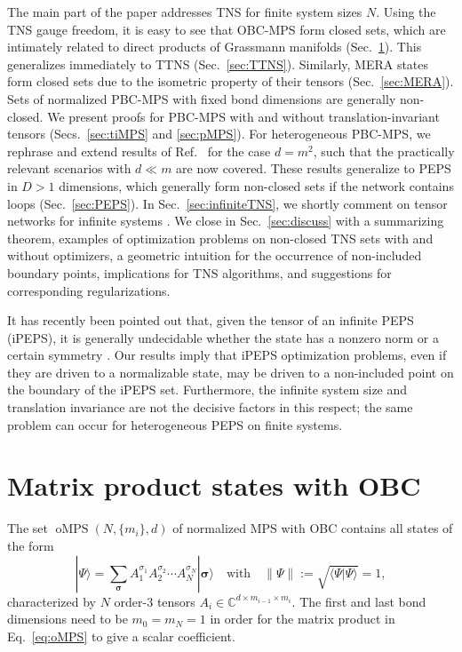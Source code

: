 \documentclass[english,11pt,aps,pra,onecolumn,tightenlines,groupedaddress,superscriptaddress,notitlepage,floatfix,fleqn]{revtex4-1}
\newcommand{\bra}{\langle}
\newcommand{\ket}{\rangle}
\renewcommand{\vec}[1]{{\boldsymbol{#1}}}
\newcommand{\s}{\sigma}
\newcommand{\vs}{\vec{\sigma}}
\newcommand{\CC}{\mathbb{C}}
\newcommand{\oMPS}{\operatorname{oMPS}}
\begin{document}
The main part of the paper addresses TNS for finite system sizes $N$. Using the TNS gauge freedom, it is easy to see that OBC-MPS form closed sets, which are intimately related to direct products of Grassmann manifolds (Sec.~\ref{sec:oMPS}). This generalizes immediately to TTNS (Sec.~\ref{sec:TTNS}). Similarly, MERA states form closed sets due to the isometric property of their tensors (Sec.~\ref{sec:MERA}).
Sets of normalized PBC-MPS with fixed bond dimensions are generally non-closed. We present proofs for PBC-MPS with and without translation-invariant tensors (Secs.~\ref{sec:tiMPS} and \ref{sec:pMPS}). For heterogeneous PBC-MPS, we rephrase and extend results of Ref.~\cite{Landsberg2012-12} for the case $d=m^2$, such that the practically relevant scenarios with $d\ll m$ are now covered.
These results generalize to PEPS in $D>1$ dimensions, which generally form non-closed sets if the network contains loops (Sec.~\ref{sec:PEPS}). In Sec.~\ref{sec:infiniteTNS}, we shortly comment on tensor networks for infinite systems \cite{Vidal2007-98,Orus2008-78,McCulloch2008_04,Zauner2018-97,Jordan2008-101,Orus2009_05,Evenbly2009-79,Montangero2008-10}.
We close in Sec.~\ref{sec:discuss} with a summarizing theorem, examples of optimization problems on non-closed TNS sets with and without optimizers, a geometric intuition for the occurrence of non-included boundary points, implications for TNS algorithms, and suggestions for corresponding regularizations.

It has recently been pointed out that, given the tensor of an infinite PEPS (iPEPS), it is generally undecidable whether the state has a nonzero norm or a certain symmetry \cite{Scarpa2020-125}. Our results imply that iPEPS optimization problems, even if they are driven to a normalizable state, may be driven to a non-included point on the boundary of the iPEPS set. Furthermore, the infinite system size and translation invariance are not the decisive factors in this respect; the same problem can occur for heterogeneous PEPS on finite systems.


\section{Matrix product states with OBC}\label{sec:oMPS}
The set $\oMPS(N,\{m_i\},d)$ of normalized MPS with OBC contains all states of the form
\begin{equation}\label{eq:oMPS}\textstyle
	|\Psi\ket=\sum_\vs A_1^{\s_1}A_2^{\s_2}\dotsb A_N^{\s_N}|\vs\ket\quad\text{with}\quad
	\|\Psi\|:=\sqrt{\bra\Psi|\Psi\ket}=1,
\end{equation}
characterized by $N$ order-3 tensors $A_i\in \CC^{d\times m_{i-1}\times m_{i}}$. The first and last bond dimensions need to be $m_0=m_N=1$ in order for the matrix product in Eq.~\eqref{eq:oMPS} to give a scalar coefficient.
\end{document}
